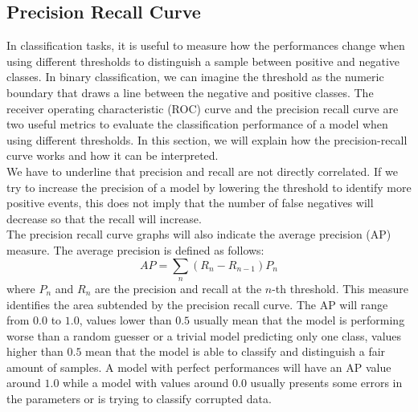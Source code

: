 \documentclass[../../Thesis.tex]{subfiles}
\begin{document}
		\subsection{Precision Recall Curve}
			In classification tasks, it is useful to measure how the performances change when using different thresholds to distinguish a sample between positive and negative classes.  In binary classification, we can imagine the threshold as the numeric boundary that draws a line between the negative and positive classes. The receiver operating characteristic (ROC) curve and the precision recall curve are two useful metrics to evaluate the classification performance of a model when using different thresholds. In this section, we will explain how the precision-recall curve works and how it can be interpreted. \\
			We have to underline that precision and recall are not directly correlated. If we try to increase the precision of a model by lowering the threshold to identify more positive events, this does not imply that the number of false negatives will decrease so that the recall will increase.\\
			The precision recall curve graphs will also indicate the average precision (AP) measure. The average precision is defined as follows:
			\[
				AP = \sum\limits_{n} (R_n - R_{n-1}) P_n
			\]
			where $P_n$ and $R_n$ are the precision and recall at the $n$-th threshold. This measure identifies the area subtended by the precision recall curve. The AP will range from $0.0$ to $1.0$, values lower than $0.5$ usually mean that the model is performing worse than a random guesser or a trivial model predicting only one class, values higher than $0.5$ mean that the model is able to classify and distinguish a fair amount of samples.  A model with perfect performances will have an AP value around $1.0$ while a model with values around $0.0$ usually presents some errors in the parameters or is trying to classify corrupted data.
\end{document}

